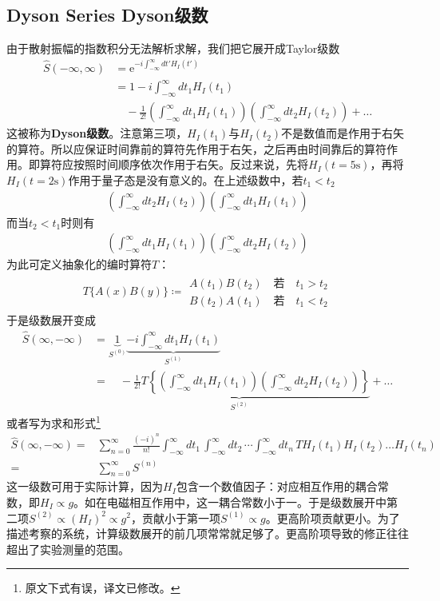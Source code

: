 \subsection[Dyson级数]{Dyson Series \quad Dyson级数}\label{sec9.5.3}
由于散射振幅的指数积分无法解析求解，我们把它展开成Taylor级数
\begin{align}\label{equ9.67}
\hat{S}(-\infty,\infty)&=\text{e}^{-i\int_{-\infty}^\infty dt' H_I(t')}\nonumber\\
&=1-i\int_{-\infty}^\infty dt_1 H_I(t_1)\nonumber\\
&\quad-\frac{1}{2!}\left(\int_{-\infty}^{\infty}dt_1 H_I(t_1)\right)\left(\int_{-\infty}^{\infty}dt_2 H_I(t_2)\right)+\ldots
\end{align}
这被称为{\bf Dyson级数}。注意第三项，$H_I(t_1)$与$H_I(t_2)$不是数值而是作用于右矢的算符。所以应保证时间靠前的算符先作用于右矢，之后再由时间靠后的算符作用。即算符应按照时间顺序依次作用于右矢。反过来说，先将$H_I(t=5\text{s})$，再将$H_I(t=2\text{s})$作用于量子态是没有意义的。在上述级数中，若$t_1<t_2$
\begin{gather*}
\left(\int_{-\infty}^{\infty}dt_2 H_I(t_2)\right)\left(\int_{-\infty}^{\infty}dt_1 H_I(t_1)\right)
\end{gather*}
而当$t_2<t_1$时则有
\begin{gather*}
\left(\int_{-\infty}^{\infty}dt_1 H_I(t_1)\right)\left(\int_{-\infty}^{\infty}dt_2 H_I(t_2)\right)
\end{gather*}
为此可定义抽象化的编时算符$T$：
\begin{align}\label{equ9.68}
T\{A(x)B(y)\}\coloneqq\begin{array}{c}A(t_1)B(t_2)\quad\text{若}\quad t_1>t_2\\B(t_2)A(t_1)\quad\text{若}\quad t_1<t_2\end{array}
\end{align}
于是级数展开变成
\begin{align}\label{equ9.69}
\hat{S}(\infty,-\infty)&=\underbrace{1}_{S^{(0)}}\underbrace{-i\int_{-\infty}^{\infty}dt_1H_I(t_1)}_{S^(1)}\nonumber\\
&=\underbrace{\quad-\frac{1}{2!}T\left\{\left(\int_{-\infty}^{\infty}dt_1 H_I(t_1)\right)\left(\int_{-\infty}^{\infty}dt_2 H_I(t_2)\right)\right\}}_{S^{(2)}}+\ldots
\end{align}
或者写为求和形式\footnote{原文下式有误，译文已修改。}
\begin{align}
	\hat{S} (\infty,-\infty) =& \sum_{n=0}^\infty \frac{(-i)^n}{n!} \int_{-\infty}^\infty dt_1\, \int_{-\infty}^\infty dt_2\, \cdots \int_{-\infty}^\infty dt_n\, T H_I(t_1) H_I(t_2) \dots H_I(t_n) \nonumber \\
	=&\sum_{n=0}^\infty S^{(n)} \label{equ9.70}
\end{align}
这一级数可用于实际计算，因为$H_I$包含一个数值因子：对应相互作用的耦合常数，即$H_I\propto g$。如在电磁相互作用中，这一耦合常数小于一。于是级数展开中第二项$S^{(2)}\propto(H_I)^2\propto g^2$，贡献小于第一项$S^{(1)}\propto g$。更高阶项贡献更小。为了描述考察的系统，计算级数展开的前几项常常就足够了。更高阶项导致的修正往往超出了实验测量的范围。

